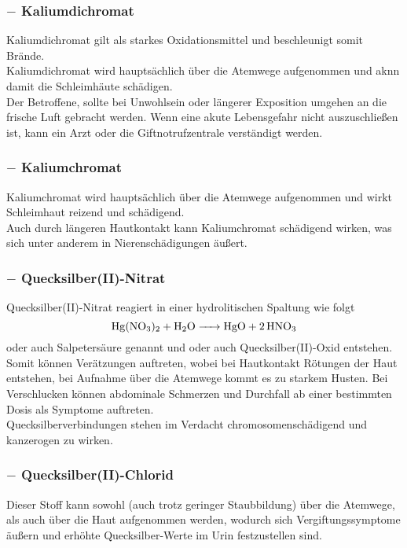 \documentclass{article}
\begin{document}
\subsubsection{ $-$ Kaliumdichromat}
Kaliumdichromat gilt als starkes Oxidationsmittel und beschleunigt somit Brände.\\
Kaliumdichromat wird hauptsächlich über die Atemwege aufgenommen und aknn damit die Schleimhäute schädigen.\\
Der Betroffene, sollte bei Unwohlsein oder längerer Exposition umgehen an die frische Luft gebracht werden. Wenn eine akute Lebensgefahr nicht auszuschließen ist, kann ein Arzt oder die Giftnotrufzentrale verständigt werden.\\

\subsubsection{ $-$ Kaliumchromat}
Kaliumchromat wird hauptsächlich über die Atemwege aufgenommen und wirkt Schleimhaut reizend und schädigend.\\
Auch durch längeren Hautkontakt kann Kaliumchromat schädigend wirken, was sich unter anderem in Nierenschädigungen äußert.\\

\subsubsection{ $-$ Quecksilber(II)-Nitrat}
Quecksilber(II)-Nitrat reagiert in einer hydrolitischen Spaltung wie folgt
\begin{equation}
    \ce{Hg(NO3)2 + H2O -> HgO + 2 HNO3}
\end{equation}
 oder auch Salpetersäure genannt und  oder auch Quecksilber(II)-Oxid entstehen.\\
Somit können Verätzungen auftreten, wobei bei Hautkontakt Rötungen der Haut entstehen, bei Aufnahme über die Atemwege kommt es zu starkem Husten.
Bei Verschlucken können abdominale Schmerzen und Durchfall ab einer bestimmten Dosis als Symptome auftreten.\\
Quecksilberverbindungen stehen im Verdacht chromosomenschädigend und kanzerogen zu wirken.\\

\subsubsection{ $-$ Quecksilber(II)-Chlorid}
Dieser Stoff kann sowohl (auch trotz geringer Staubbildung) über die Atemwege, als auch über die Haut aufgenommen werden, wodurch sich Vergiftungssymptome äußern und erhöhte Quecksilber-Werte im Urin festzustellen sind.\\
\end{document}
